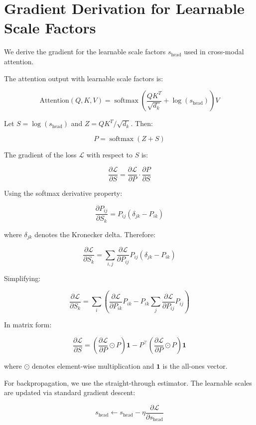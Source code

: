 \documentclass[journal,twoside]{IEEEtran}
\theoremstyle{definition}
\theoremstyle{remark}
\DeclareMathOperator{\softmax}{softmax}
\begin{document}
\section{Gradient Derivation for Learnable Scale Factors}
\label{app:c}

We derive the gradient for the learnable scale factors $s_{\text{head}}$ used in cross-modal attention.

The attention output with learnable scale factors is:

\[
\text{Attention}(Q, K, V) = \softmax\left( \frac{Q K^T}{\sqrt{d_k}} + \log(s_{\text{head}}) \right) V
\]

Let $S = \log(s_{\text{head}})$ and $Z = QK^T / \sqrt{d_k}$. Then:

\[
P = \softmax(Z + S)
\]

The gradient of the loss $\mathcal{L}$ with respect to $S$ is:

\[
\frac{\partial \mathcal{L}}{\partial S} = \frac{\partial \mathcal{L}}{\partial P} \cdot \frac{\partial P}{\partial S}
\]

Using the softmax derivative property:

\[
\frac{\partial P_{ij}}{\partial S_k} = P_{ij}(\delta_{jk} - P_{ik})
\]

where $\delta_{jk}$ denotes the Kronecker delta. Therefore:

\[
\frac{\partial \mathcal{L}}{\partial S_k} = \sum_{i,j} \frac{\partial \mathcal{L}}{\partial P_{ij}} P_{ij}(\delta_{jk} - P_{ik})
\]

Simplifying:

\[
\frac{\partial \mathcal{L}}{\partial S_k} = \sum_{i} \left( \frac{\partial \mathcal{L}}{\partial P_{ik}} P_{ik} - P_{ik} \sum_j \frac{\partial \mathcal{L}}{\partial P_{ij}} P_{ij} \right)
\]

In matrix form:

\[
\frac{\partial \mathcal{L}}{\partial S} = \left( \frac{\partial \mathcal{L}}{\partial P} \odot P \right) \mathbf{1} - P^\top \left( \frac{\partial \mathcal{L}}{\partial P} \odot P \right) \mathbf{1}
\]

where $\odot$ denotes element-wise multiplication and $\mathbf{1}$ is the all-ones vector.

For backpropagation, we use the straight-through estimator. The learnable scales are updated via standard gradient descent:

\[
s_{\text{head}} \leftarrow s_{\text{head}} - \eta \frac{\partial \mathcal{L}}{\partial s_{\text{head}}}
\]
\end{document}
